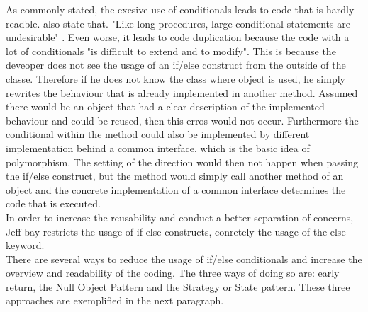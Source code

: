 As commonly stated, the exesive use of conditionals leads to code that is hardly readble. \cite{gof} also state that. "Like long procedures, large conditional statements are undesirable" \cite{gof}. Even worse, it leads to code duplication because the code with a lot of conditionals "is difficult to extend and to modify"\cite{gof}. This is because the deveoper does not see the usage of an if/else construct from the outside of the classe. Therefore if he does not know the class where object is used, he simply rewrites the behaviour that is already implemented in another method. Assumed there would be an object that had a clear description of the implemented behaviour and could be reused, then this erros would not occur. Furthermore the conditional within the method could also be implemented by different implementation behind a common interface, which is the basic idea of polymorphism. The setting of the direction would then not happen when passing the if/else construct, but the method would simply call another method of an object and the concrete implementation of a common interface determines the code that is executed. 
\\

In order to increase the reusability and conduct a better separation of concerns, Jeff bay restricts the usage of if else constructs, conretely the usage of the else keyword.
\\

There are several ways to reduce the usage of if/else conditionals and increase the overview and readability of the coding. The three ways of doing so are: early return, the Null Object Pattern and the Strategy or State pattern. These three approaches are exemplified in the next paragraph. 
\\


